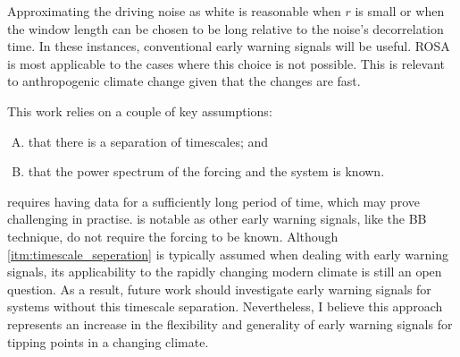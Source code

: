 Approximating the driving noise as white is reasonable when $r$ is 
small or when the window length can be chosen to be long relative to the 
noise's decorrelation time. In these instances, conventional early warning signals will be useful. ROSA is most applicable to the cases where this choice is not
possible. This is relevant to anthropogenic climate change given that the changes are fast.

This work relies on a couple of  key assumptions:
\begin{enumerate}[A.]
\item \label{itm:timescale_seperation} that there is a separation of timescales; and
\item \label{itm:exists} that the power spectrum of the forcing and the system is known.
\end{enumerate}
 requires having data for a sufficiently long period of time, which may 
prove challenging in practise.  is notable as other early warning signals, like the BB technique, do not require the forcing to be known.
Although \cref{itm:timescale_seperation} is typically assumed when dealing with early warning signals, its applicability
to the rapidly changing modern climate is still an open question.
As a result, future work should investigate early warning signals for systems without this timescale separation.
Nevertheless, I believe this approach represents an increase in the flexibility and generality of early warning signals for tipping points in a changing climate.



